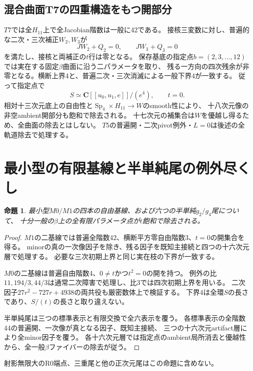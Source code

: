 \documentclass[11pt,a4paper]{ltjsarticle}
\newcommand{\CC}{\mathbf C}
\DeclareMathOperator{\Sp}{Sp}
\newtheorem{proposition}[theorem]{命題}
\theoremstyle{remark}
\begin{document}
\subsection{混合曲面T7の四重構造をもつ開部分}
$T7$では全$H_{11}$上で全Jacobian階数は一般に42である。
接核三変数に対し、普遍的な二次・三次補正$W_2,W_3$が
\[
 JW_2+Q_2=0,\qquad JW_3+Q_3=0
\]
を満たし、接核と両補正の$t$行は零となる。
保存基底の指定点$b=(2,3,\ldots,12)$では実在する固定$\beta$曲面に沿う二パラメータを取り、
残る一方向の四次残余が非零となる。横断上界4と、普遍二次・三次消滅による一般下界4が一致する。
従って指定点で
\[
 S\simeq\CC[[u_0,u_1,e]]/(e^4),\qquad t=0.
\]
相対十三次元底上の自由性と$\Sp_4\times H_{11}\to W$のsmooth性により、
十八次元像の非空ambient開部分も飽和で除去される\cite{mixed-t7-v39}。
十七次元の補集合は$W$を優越し得るため、全曲面の除去とはしない。
$T5$の普遍開・二次pivot例外・$L=0$は後述の全軌道除去で処理する。

\section{最小型の有限基線と半単純尾の例外尽くし}
\begin{proposition}
最小型$M0/M1$の四本の自由基線、および六つの半単純$g_2/g_4$尾について、
十分一般の$\beta$上の全有限パラメータ点が$t$飽和で除去される。
\end{proposition}
\begin{proof}
$M1$の二基線では普遍全階数42、横断平方零自由階数3、$t=0$の開集合を得る。
minorの真の一次像因子を除き、残る因子を既知主接続と四つの十六次元層で処理する。
必要な三次初期上界と同じ実在枝の下界が一致する\cite{minimal-m1-v39}。

$M0$の二基線は普遍自由階数4、$0\ne t$かつ$t^2=0$の開を持つ。
例外の比$11,194/3,44/3$は通常二次障害で処理し、比3では四次初期上界を用いる。
二次因子$27r^2-727r+4938$の両共役も厳密数体上で検証する。
下界4は全環$S$の長さであり、$S/(t)$の長さと取り違えない\cite{minimal-m0-v39}。

半単純尾は三つの標準表示と有限交換で全六表示を覆う。
各標準表示の全階数44の普遍開、一次像が真となる因子、既知主接続、
三つの十六次元artifact層により全minor因子を覆う\cite{minimal-semisimple-v39}。
各十六次元層では指定点のambient局所消去と優越性から、全一般$\beta$ファイバーの除去が従う。
\end{proof}
射影無限大のR0端点、三重尾と他の正次元尾はこの命題に含めない。
\end{document}
